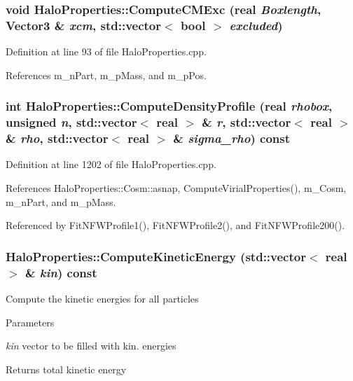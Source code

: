 \subsubsection[{ComputeCMExc}]{\setlength{\rightskip}{0pt plus 5cm}void HaloProperties::ComputeCMExc ({\bf real} {\em Boxlength}, \/  {\bf Vector3} \& {\em xcm}, \/  std::vector$<$ bool $>$ {\em excluded})}\label{classHaloProperties_a79438fc145a289259c5f0f9ccd40885a}


Definition at line 93 of file HaloProperties.cpp.



References m\_\-nPart, m\_\-pMass, and m\_\-pPos.

\subsubsection[{ComputeDensityProfile}]{\setlength{\rightskip}{0pt plus 5cm}int HaloProperties::ComputeDensityProfile ({\bf real} {\em rhobox}, \/  unsigned {\em n}, \/  std::vector$<$ {\bf real} $>$ \& {\em r}, \/  std::vector$<$ {\bf real} $>$ \& {\em rho}, \/  std::vector$<$ {\bf real} $>$ \& {\em sigma\_\-rho}) const}\label{classHaloProperties_a07c1aa990f6a5ecc57f88514c152f795}


Definition at line 1202 of file HaloProperties.cpp.



References HaloProperties::Cosm::asnap, ComputeVirialProperties(), m\_\-Cosm, m\_\-nPart, and m\_\-pMass.



Referenced by FitNFWProfile1(), FitNFWProfile2(), and FitNFWProfile200().

\subsubsection[{ComputeKineticEnergy}]{ HaloProperties::ComputeKineticEnergy (std::vector$<$ {\bf real} $>$ \& {\em kin}) const}\label{classHaloProperties_adb78899cbb93730081f5473c5c82608f}
Compute the kinetic energies for all particles 
\begin{DoxyParams}{Parameters}
\item[{\em kin}]vector to be filled with kin. energies \end{DoxyParams}
\begin{DoxyReturn}{Returns}
total kinetic energy 
\end{DoxyReturn}



